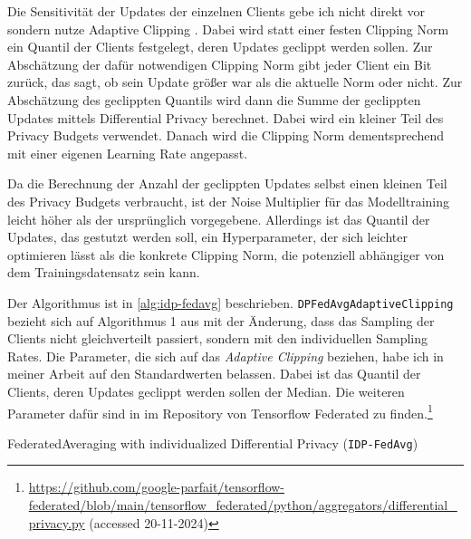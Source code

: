 Die Sensitivität der Updates der einzelnen Clients gebe ich nicht direkt vor sondern nutze Adaptive Clipping \cite{andrew:2021}. Dabei wird statt einer festen Clipping Norm ein Quantil der Clients festgelegt, deren Updates geclippt werden sollen. Zur Abschätzung der dafür notwendigen Clipping Norm gibt jeder Client ein Bit zurück, das sagt, ob sein Update größer war als die aktuelle Norm oder nicht. Zur Abschätzung des geclippten Quantils wird dann die Summe der geclippten Updates mittels Differential Privacy berechnet. Dabei wird ein kleiner Teil des Privacy Budgets verwendet. Danach wird die Clipping Norm dementsprechend mit einer eigenen Learning Rate angepasst. 

Da die Berechnung der Anzahl der geclippten Updates selbst einen kleinen Teil des Privacy Budgets verbraucht, ist der Noise Multiplier für das Modelltraining leicht höher als der ursprünglich vorgegebene. Allerdings ist das Quantil der Updates, das gestutzt werden soll, ein Hyperparameter, der sich leichter optimieren lässt als die konkrete Clipping Norm, die potenziell abhängiger von dem Trainingsdatensatz sein kann.

Der Algorithmus ist in \autoref{alg:idp-fedavg} beschrieben. \texttt{DPFedAvgAdaptiveClipping} bezieht sich auf Algorithmus 1 aus \textcite[p.4]{andrew:2021} mit der Änderung, dass das Sampling der Clients nicht gleichverteilt passiert, sondern mit den individuellen Sampling Rates. Die Parameter, die sich auf das \textit{Adaptive Clipping} beziehen, habe ich in meiner Arbeit auf den Standardwerten belassen. Dabei ist das Quantil der Clients, deren Updates geclippt werden sollen der Median. Die weiteren Parameter dafür sind in im Repository von Tensorflow Federated zu finden.\footnote{\url{https://github.com/google-parfait/tensorflow-federated/blob/main/tensorflow_federated/python/aggregators/differential_privacy.py} (accessed 20-11-2024)}


\begin{algorithm}[tb]
	\caption{FederatedAveraging with individualized Differential Privacy (\texttt{IDP-FedAvg})}
	\label{alg:idp-fedavg}
\end{algorithm}
